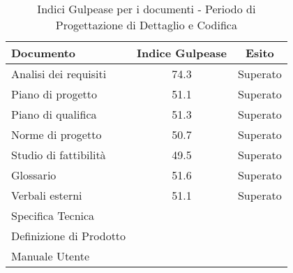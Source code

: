       
      \begin{table}[H]
        \centering
        \begin{tabular}{|l|c|c|}
          \hline
          \textbf{Documento} &\textbf{Indice Gulpease} &\textbf{Esito}\\
          \hline
          Analisi dei requisiti &74.3  &Superato \\
          Piano di progetto &51.1  &Superato \\
          Piano di qualifica  &51.3  &Superato \\
          Norme di progetto &50.7  &Superato \\
          Studio di fattibilità &49.5  &Superato \\
          Glossario &51.6  &Superato  \\
          Verbali esterni &51.1  &Superato \\
          Specifica Tecnica & & \\
          Definizione di Prodotto & & \\
          Manuale Utente & & \\
          \hline
        \end{tabular}
        \caption{Indici Gulpease per i documenti - Periodo di Progettazione di Dettaglio e Codifica}
      \end{table}

